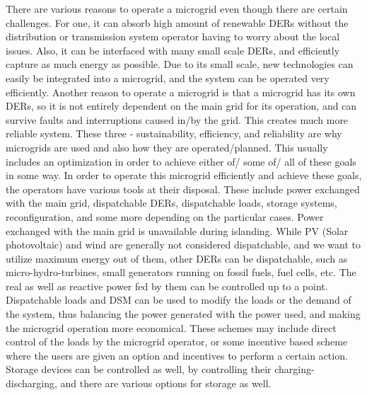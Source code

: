 There are various reasons to operate a microgrid even though there are certain challenges. For one, it can absorb high amount of renewable DERs without the distribution or transmission system operator having to worry about the local issues. Also, it can be interfaced with many small scale DERs, and efficiently capture as much energy as possible. Due to its small scale, new technologies can easily be integrated into a microgrid, and the system can be operated very efficiently. Another reason to operate a microgrid is that a microgrid has its own DERs, so it is not entirely dependent on the main grid for its operation, and can survive faults and interruptions caused in/by the grid. This creates much more reliable system. These three - sustainability, efficiency, and reliability are why microgrids are used and also how they are operated/planned\citep{mgb05}.
This usually includes an optimization in order to achieve either of/ some of/ all of these goals in some way.
In order to operate this microgrid efficiently and achieve these goals, the operators have various tools at their disposal. These include power exchanged with the main grid, dispatchable DERs, dispatchable loads, storage systems, reconfiguration, and some more depending on the particular cases. Power exchanged with the main grid is unavailable during islanding. While PV (Solar photovoltaic) and wind are generally not considered dispatchable, and we want to utilize maximum energy out of them, other DERs can be dispatchable, such as micro-hydro-turbines, small generators running on fossil fuels, fuel cells, etc. The real as well as reactive power fed by them can be controlled up to a point. Dispatchable loads and DSM can be used to modify the loads or the demand of the system, thus balancing the power generated with the power used, and making the microgrid operation more economical. These schemes may include direct control of the loads by the microgrid operator, or some incentive based scheme where the users are given an option and incentives to perform a certain action. Storage devices can be controlled as well, by controlling their charging-discharging, and there are various options for storage as well.\\
